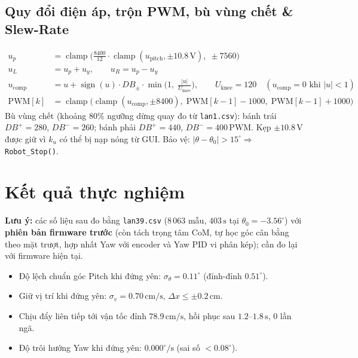 \documentclass[10pt,a4paper]{article}
\newcommand{\clamp}{\operatorname{clamp}}
\begin{document}
\subsection{Quy đổi điện áp, trộn PWM, bù vùng chết \& Slew-Rate}
\begin{align}
u_p &= \clamp\!\Big(\tfrac{8400}{12} \cdot \clamp(u_{\text{pitch}}, \pm 10.8\,\text{V}),\; \pm 7560\Big) \\
u_L &= u_p + u_y, \qquad u_R = u_p - u_y \\
u_{\text{comp}} &= u + \operatorname{sign}(u) \cdot DB_{\pm} \cdot \min\!\Big(1,\; \frac{|u|}{U_{\text{knee}}}\Big), \qquad U_{\text{knee}} = 120 \quad (u_{\text{comp}} = 0 \text{ khi } |u| < 1) \\
\text{PWM}[k] &= \clamp\big(\clamp(u_{\text{comp}}, \pm 8400),\; \text{PWM}[k-1] - 1000,\; \text{PWM}[k-1] + 1000\big)
\end{align}
Bù vùng chết (khoảng 80\% ngưỡng dừng quay đo từ \texttt{lan1.csv}): bánh trái $DB^+ = 280$, $DB^- = 260$; bánh phải $DB^+ = 440$, $DB^- = 400\,\text{PWM}$. Kẹp $\pm 10.8\,\text{V}$ được giữ vì $k_u$ có thể bị nạp nóng từ GUI. Bảo vệ: $|\theta - \theta_0| > 15^\circ \Rightarrow$ \texttt{Robot\_Stop()}.

\section{Kết quả thực nghiệm}
\textbf{Lưu ý:} các số liệu sau đo bằng \texttt{lan39.csv} (8\,063 mẫu, $403\,\text{s}$ tại $\theta_0 = -3.56^\circ$) với \textbf{phiên bản firmware trước} (còn tách trọng tâm CoM, tự học góc cân bằng theo mặt trượt, hợp nhất Yaw với encoder và Yaw PID vi phân kép); cần đo lại với firmware hiện tại.
\begin{itemize}
    \item Độ lệch chuẩn góc Pitch khi đứng yên: $\sigma_\theta = 0.11^\circ$ (đỉnh-đỉnh $0.51^\circ$).
    \item Giữ vị trí khi đứng yên: $\sigma_v = 0.70\,\text{cm/s}$, $\Delta x \le \pm 0.2\,\text{cm}$.
    \item Chịu đẩy liên tiếp tới vận tốc đỉnh $78.9\,\text{cm/s}$, hồi phục sau $1.2$--$1.8\,\text{s}$, 0 lần ngã.
    \item Độ trôi hướng Yaw khi đứng yên: $0.000^\circ/\text{s}$ (sai số $< 0.08^\circ$).
\end{itemize}
\end{document}
